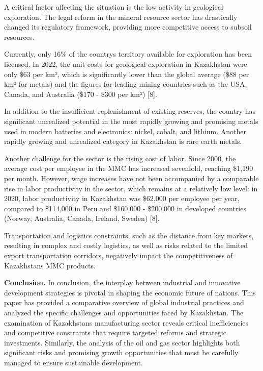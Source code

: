\begin{multicols}{2}
A critical factor affecting the situation is the low activity in
geological exploration. The legal reform in the mineral resource sector
has drastically changed its regulatory framework, providing more
competitive access to subsoil resources.

Currently, only 16\% of the country\textquotesingle s territory
available for exploration has been licensed. In 2022, the unit costs for
geological exploration in Kazakhstan were only \$63 per km², which is
significantly lower than the global average (\$88 per km² for metals)
and the figures for leading mining countries such as the USA, Canada,
and Australia (\$170 - \$300 per km²) {[}8{]}.

In addition to the insufficient replenishment of existing reserves, the
country has significant unrealized potential in the most rapidly growing
and promising metals used in modern batteries and electronics: nickel,
cobalt, and lithium. Another rapidly growing and unrealized category in
Kazakhstan is rare earth metals.

Another challenge for the sector is the rising cost of labor. Since
2000, the average cost per employee in the MMC has increased sevenfold,
reaching \$1,190 per month. However, wage increases have not been
accompanied by a comparable rise in labor productivity in the sector,
which remains at a relatively low level: in 2020, labor productivity in
Kazakhstan was \$62,000 per employee per year, compared to \$114,000 in
Peru and \$160,000 - \$200,000 in developed countries (Norway,
Australia, Canada, Ireland, Sweden) {[}8{]}.

Transportation and logistics constraints, such as the distance from key
markets, resulting in complex and costly logistics, as well as risks
related to the limited export transportation corridors, negatively
impact the competitiveness of Kazakhstan\textquotesingle s MMC products.

{\bfseries Conclusion.} In conclusion, the interplay between industrial and
innovative development strategies is pivotal in shaping the economic
future of nations. This paper has provided a comparative overview of
global industrial practices and analyzed the specific challenges and
opportunities faced by Kazakhstan. The examination of
Kazakhstan\textquotesingle s manufacturing sector reveals critical
inefficiencies and competitive constraints that require targeted reforms
and strategic investments. Similarly, the analysis of the oil and gas
sector highlights both significant risks and promising growth
opportunities that must be carefully managed to ensure sustainable
development.


\end{multicols}
